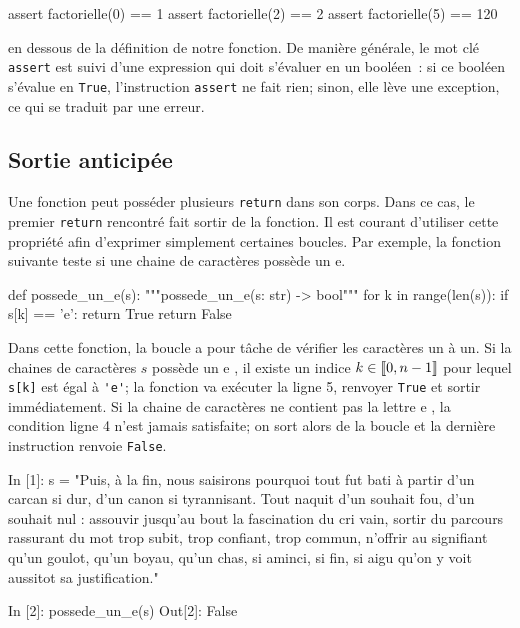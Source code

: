 \documentclass{magnolia}
\begin{document}
\begin{pythoncodeline}
assert factorielle(0) == 1
assert factorielle(2) == 2
assert factorielle(5) == 120
\end{pythoncodeline}
en dessous de la définition de notre fonction. De manière générale, le mot clé \verb!assert! est suivi d'une
expression qui doit s'évaluer en un booléen~: si ce booléen s'évalue en \verb!True!, l'instruction
\verb!assert! ne fait rien; sinon, elle lève une exception, ce qui se traduit par une erreur.

\subsection{Sortie anticipée}

Une fonction peut posséder plusieurs \verb_return_ dans son corps. Dans ce cas, le
premier \verb_return_ rencontré fait sortir de la fonction. Il est courant d'utiliser
cette propriété afin d'exprimer simplement certaines boucles. Par exemple, la fonction
suivante teste si une chaine de caractères possède un e.

\begin{pythoncodeline}
def possede_un_e(s):
    """possede_un_e(s: str) -> bool"""
    for k in range(len(s)):
        if s[k] == 'e':
            return True
    return False
\end{pythoncodeline}

\noindent
Dans cette fonction, la boucle a pour tâche de vérifier les caractères un à un. Si la
chaines de caractères $s$ possède un \og e \fg, il existe un indice $k\in\left\llbracket 0,n-1\right\rrbracket$
pour lequel \verb_s[k]_ est égal à \verb_'e'_; la fonction va exécuter la ligne 5,
renvoyer \verb_True_ et sortir immédiatement. Si la chaine de caractères
ne contient pas la lettre \og e \fg, la condition ligne 4 n'est jamais
satisfaite; on sort alors de la boucle et la dernière instruction renvoie \verb_False_.

\begin{pythoncode}
In [1]: s = "Puis, à la fin, nous saisirons pourquoi tout fut bati à partir d'un carcan si dur, d'un canon si tyrannisant. Tout naquit d'un souhait fou, d'un souhait nul : assouvir jusqu'au bout la fascination du cri vain, sortir du parcours rassurant du mot trop subit, trop confiant, trop commun, n'offrir au signifiant qu'un goulot, qu'un boyau, qu'un chas, si aminci, si fin, si aigu qu'on y voit aussitot sa justification."

In [2]: possede_un_e(s)
Out[2]: False
\end{pythoncode}
\end{document}
